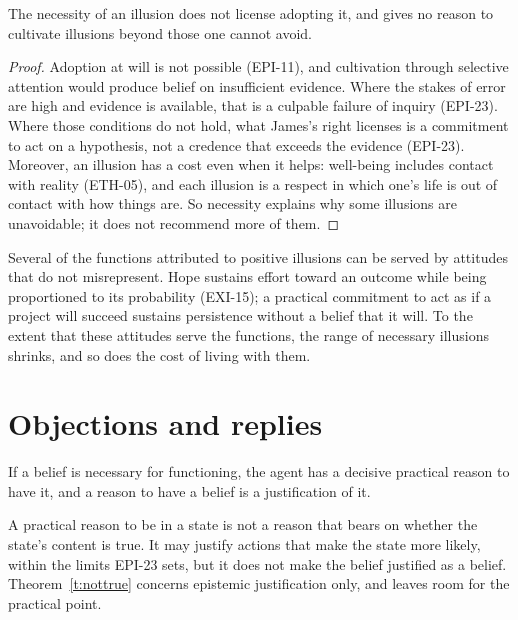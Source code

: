 \documentclass{situationist-preprint}
\begin{document}
\begin{corollary}[No license]\label{c:license}
The necessity of an illusion does not license adopting it, and gives no reason to cultivate illusions beyond those one cannot avoid.
\end{corollary}

\begin{proof}
Adoption at will is not possible (EPI-11), and cultivation through selective attention would produce belief on insufficient evidence. Where the stakes of error are high and evidence is available, that is a culpable failure of inquiry (EPI-23). Where those conditions do not hold, what James's right licenses is a commitment to act on a hypothesis, not a credence that exceeds the evidence (EPI-23). Moreover, an illusion has a cost even when it helps: well-being includes contact with reality (ETH-05), and each illusion is a respect in which one's life is out of contact with how things are. So necessity explains why some illusions are unavoidable; it does not recommend more of them.
\end{proof}

\begin{remark}[Substitutes]\label{r:subst}
Several of the functions attributed to positive illusions can be served by attitudes that do not misrepresent. Hope sustains effort toward an outcome while being proportioned to its probability (EXI-15); a practical commitment to act as if a project will succeed sustains persistence without a belief that it will. To the extent that these attitudes serve the functions, the range of necessary illusions shrinks, and so does the cost of living with them.
\end{remark}

\section{Objections and replies}

\begin{objection}\label{o:prag}
If a belief is necessary for functioning, the agent has a decisive practical reason to have it, and a reason to have a belief is a justification of it.
\end{objection}

\begin{reply}
A practical reason to be in a state is not a reason that bears on whether the state's content is true. It may justify actions that make the state more likely, within the limits EPI-23 sets, but it does not make the belief justified as a belief. Theorem~\ref{t:nottrue} concerns epistemic justification only, and leaves room for the practical point.
\end{reply}
\end{document}
